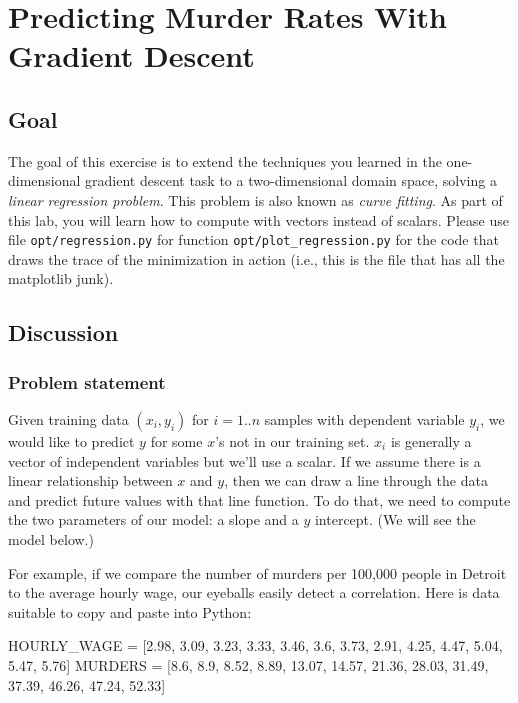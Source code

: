 \chapter{Predicting Murder Rates With Gradient Descent}

\section{Goal}

\begin{fullwidth}

The goal of this exercise is to extend the techniques you learned in the one-dimensional gradient descent task to a two-dimensional domain space, solving a {\em linear regression problem}.  This problem is also known as {\em curve fitting}.  As part of this lab, you will learn how to compute with vectors instead of scalars. Please use file {\tt opt/regression.py} for function {\tt opt/plot\_regression.py} for the code that draws the trace of the minimization in action (i.e., this is the file that has all the matplotlib junk).


\section{Discussion}

\subsection{Problem statement}

Given training data $(x_i, y_i)$ for $i=1..n$ samples with dependent variable $y_i$, we would like to predict $y$ for some $x$'s not in our training set. $x_i$ is generally a vector of independent variables but we'll use a scalar. If we assume there is a linear relationship between $x$ and $y$, then we can draw a line through the data and predict future values with that line function. To do that, we need to compute the two parameters of our model: a slope and a $y$ intercept. (We will see the model below.)

For example, if we compare the number of murders per 100,000 people in Detroit to the average hourly wage, our eyeballs easily detect a correlation.  Here is data suitable to copy and paste into Python:

\begin{pyverbatim}
HOURLY_WAGE = [2.98, 3.09, 3.23, 3.33, 3.46, 3.6, 3.73, 2.91, 4.25, 4.47, 5.04, 5.47, 5.76]
MURDERS = [8.6, 8.9, 8.52, 8.89, 13.07, 14.57, 21.36, 28.03, 31.49, 37.39, 46.26, 47.24, 52.33]
\end{pyverbatim}


\end{fullwidth}
